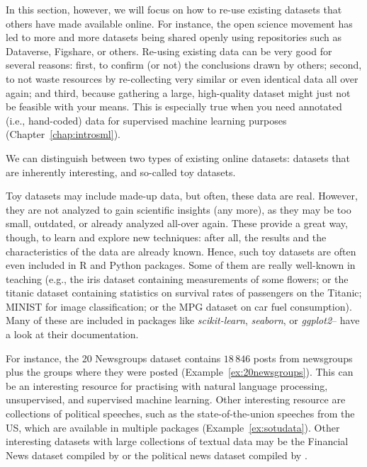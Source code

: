 In this section, however, we will focus on how to re-use existing
datasets that others have made available online. For instance, the
open science movement has led to more and more datasets being shared
openly using repositories such as Dataverse, Figshare, or
others. Re-using existing data can be very good for several reasons:
first, to confirm (or not) the conclusions drawn by others; second, to
not waste resources by re-collecting very similar or even identical
data all over again; and third, because gathering a large,
high-quality dataset might just not be feasible with your means. This
is especially true when you need annotated (i.e., hand-coded) data for
supervised machine learning purposes (Chapter~\ref{chap:introsml}).

We can distinguish between two types of existing online datasets:
datasets that are inherently interesting, and so-called toy datasets.

Toy datasets may include made-up data, but often, these data are
real. However, they are not analyzed to gain scientific insights (any
more), as they may be too small, outdated, or already analyzed
all-over again. These provide a great way, though, to learn and
explore new techniques: after all, the results and the characteristics
of the data are already known. Hence, such toy datasets are often
even included in R and Python packages. Some of them are really
well-known in teaching (e.g., the iris dataset containing measurements
of some flowers; or the titanic dataset containing statistics on
survival rates of passengers on the Titanic; MINIST for image classification; or the MPG dataset on car fuel consumption). Many of these are included
in packages like \emph{scikit-learn}, \emph{seaborn}, or \emph{ggplot2}-- have a look at their documentation.

For instance, the 20 Newsgroups dataset contains $18\,846$ posts from
newsgroups plus the groups where they were posted
(Example~\ref{ex:20newsgroups}). This can be an interesting resource for
practising  with natural language processing, unsupervised, and
supervised machine learning. Other interesting resource are
collections of political speeches, such as the state-of-the-union
speeches from the US, which are available in multiple packages
(Example~\ref{ex:sotudata}).
Other interesting datasets with large collections of textual data may
be the Financial News dataset compiled by \cite{Chen2017} or the
political news dataset compiled by \cite{Horne2018}.


